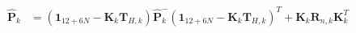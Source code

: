 \documentclass[10pt,letterpaper,fleqn,oneside]{article}
\def\Vec#1{\mathbf{#1}} %
\begin{document}
\begin{align}
\hat{\Vec{P}}_k &= \left(\Vec{1}_{12+6N} - \Vec{K}_k\Vec{T}_{H,k} \right)\hat{\Vec{P}}^-_k\left(\Vec{1}_{12+6N} - \Vec{K}_k\Vec{T}_{H,k} \right)^T + \Vec{K}_k\Vec{R}_{n,k}\Vec{K}_k^T
\end{align}


%
%

\end{document}
